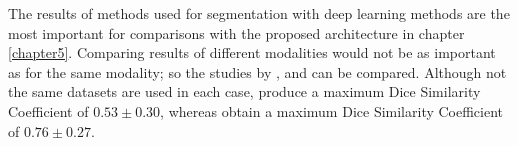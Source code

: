 The results of methods used for segmentation with deep learning methods are the most important for comparisons with the proposed architecture in chapter \ref{chapter5}. Comparing results of different modalities would not be as important as for the same modality; so the studies by \citeauthor{Yang2020}, and \citeauthor{Sichermann2019} can be compared. Although not the same datasets are used in each case, \citeauthor{Sichermann2019} produce a maximum Dice Similarity Coefficient of $0.53 \pm 0.30$, whereas \citeauthor{Yang2020} obtain a maximum Dice Similarity Coefficient of $0.76 \pm 0.27$.


%
%
%


